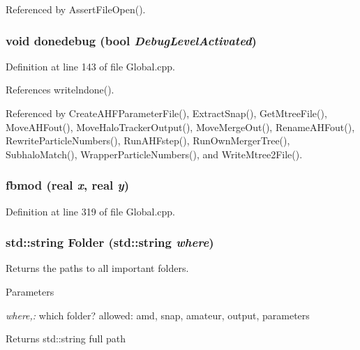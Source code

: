 Referenced by AssertFileOpen().

\subsubsection[{donedebug}]{\setlength{\rightskip}{0pt plus 5cm}void donedebug (bool {\em DebugLevelActivated})}\label{Global_8h_a537260c4c4c2057809ee9ca92cf460c7}


Definition at line 143 of file Global.cpp.



References writelndone().



Referenced by CreateAHFParameterFile(), ExtractSnap(), GetMtreeFile(), MoveAHFout(), MoveHaloTrackerOutput(), MoveMergeOut(), RenameAHFout(), RewriteParticleNumbers(), RunAHFstep(), RunOwnMergerTree(), SubhaloMatch(), WrapperParticleNumbers(), and WriteMtree2File().

\subsubsection[{fbmod}]{ fbmod ({\bf real} {\em x}, \/  {\bf real} {\em y})}\label{Global_8h_aa92971b06497e2333e4bc532a86297cb}


Definition at line 319 of file Global.cpp.

\subsubsection[{Folder}]{\setlength{\rightskip}{0pt plus 5cm}std::string Folder (std::string {\em where})}\label{Global_8h_ad3867aaa410297f271cb4a5f443f368c}
Returns the paths to all important folders. 
\begin{DoxyParams}{Parameters}
\item[{\em where,:}]which folder? allowed: amd, snap, amateur, output, parameters \end{DoxyParams}
\begin{DoxyReturn}{Returns}
std::string full path 
\end{DoxyReturn}


